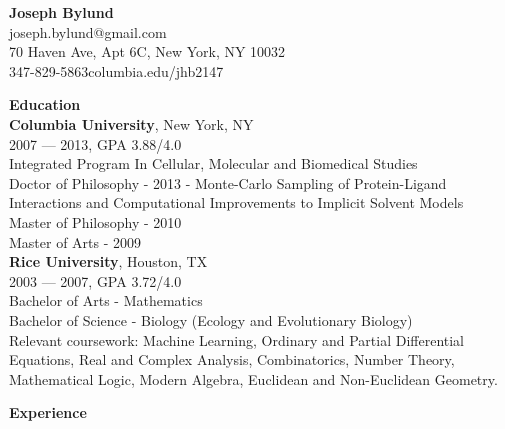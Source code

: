 
\begin{center}
\myfontsize{\bigheader}
\textbf{Joseph Bylund}\\
\myfontsize{\bodysize}
joseph.bylund@gmail.com\\
70 Haven Ave, Apt 6C, New York, NY 10032\\
347-829-5863\hspace{3ex}columbia.edu/{\mytilde}jhb2147\\
\end{center}

\myfontsize{\bigheader}
\textbf{Education}\\
\myfontsize{\bodysize}
\textbf{Columbia University}, New York, NY\\
2007 --- 2013, GPA 3.88/4.0\\
Integrated Program In Cellular, Molecular and Biomedical Studies\\
Doctor of Philosophy - 2013 - Monte-Carlo Sampling of Protein-Ligand Interactions and Computational Improvements to Implicit Solvent Models\\
Master of Philosophy - 2010\\
Master of Arts - 2009\\
\vspace{\littleskip}
\textbf{Rice University}, Houston, TX\\
2003 --- 2007, GPA 3.72/4.0\\
Bachelor of Arts - Mathematics\\
Bachelor of Science - Biology (Ecology and Evolutionary Biology)\\
Relevant coursework: Machine Learning, Ordinary and Partial Differential Equations, Real and Complex Analysis, Combinatorics, Number Theory, Mathematical Logic, Modern Algebra, Euclidean and Non-Euclidean Geometry.

\vspace{\mybigskip}
\myfontsize{\bigheader}
\textbf{Experience}

